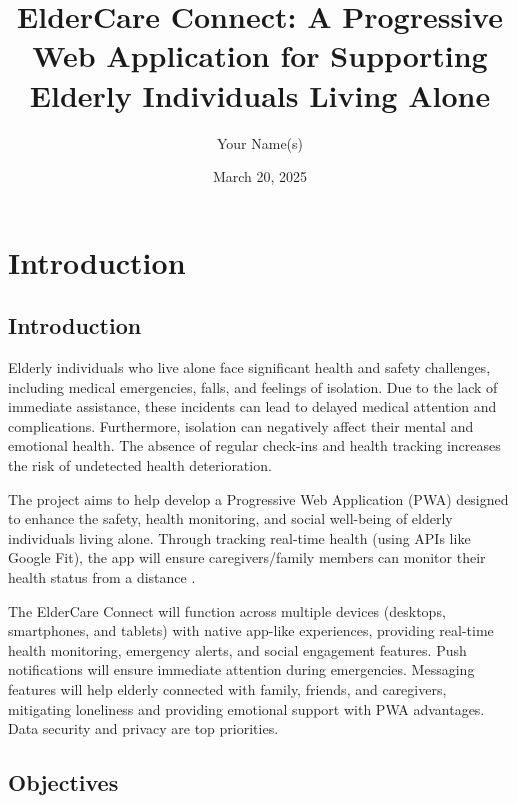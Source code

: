 \documentclass{article}
\begin{document}
\title{ElderCare Connect: A Progressive Web Application for Supporting Elderly Individuals Living Alone}
\author{Your Name(s)}
\date{March 20, 2025}
\maketitle

\section{Introduction}
\subsection{Introduction}

Elderly individuals who live alone face significant health and safety challenges, including medical emergencies, falls, and feelings of isolation. Due to the lack of immediate assistance, these incidents can lead to delayed medical attention and complications. Furthermore, isolation can negatively affect their mental and emotional health. The absence of regular check-ins and health tracking increases the risk of undetected health deterioration.

The project aims to help develop a Progressive Web Application (PWA) designed to enhance the safety, health monitoring, and social well-being of elderly individuals living alone. Through tracking real-time health (using APIs like Google Fit), the app will ensure caregivers/family members can monitor their health status from a distance .

The ElderCare Connect will function across multiple devices (desktops, smartphones, and tablets) with native app-like experiences, providing real-time health monitoring, emergency alerts, and social engagement features.  Push notifications will ensure immediate attention during emergencies. Messaging features will help elderly connected with family, friends, and caregivers, mitigating loneliness and providing emotional support with PWA advantages. Data security and privacy are top priorities.

\subsection{Objectives}
\end{document}
